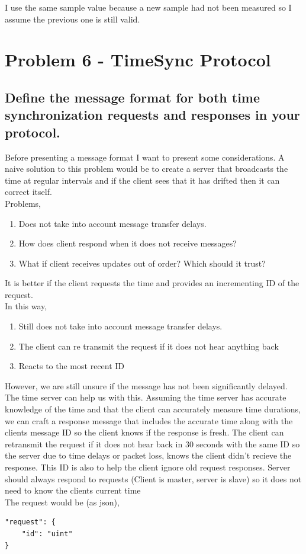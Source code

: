 \documentclass{article}
\begin{document}
	I use the same sample value because a new sample had not been measured so I assume the previous one is still valid.

\section{Problem 6 - TimeSync Protocol}

\subsection{Define the message format for both time synchronization requests and responses
in your protocol.}
		Before presenting a message format I want to present some considerations. A naive solution to this problem would be to create a 
		server that broadcasts the time at regular intervals and if the client sees that it has drifted then it can correct itself. \\

		Problems,
		\begin{enumerate}
			\item Does not take into account message transfer delays.
			\item How does client respond when it does not receive messages?
			\item What if client receives updates out of order? Which should it trust?
		\end{enumerate}

		It is better if the client requests the time and provides an incrementing ID of the request.\\
		In this way,
		\begin{enumerate}
			\item Still does not take into account message transfer delays.
			\item The client can re transmit the request if it does not hear anything back
			\item Reacts to the most recent ID
		\end{enumerate}

		However, we are still unsure if the message has not been significantly delayed. The time server can help us with this.
		Assuming the time server has accurate knowledge of the time and that the client can accurately measure time durations, we can craft a response message that includes the accurate time along with the clients message ID so
		the client knows if the response is fresh. The client can retransmit the request if it does not hear back in 30 seconds with the same ID so the server due to time delays or packet loss,
		knows the client didn't recieve the response. This ID is also to help the client ignore old request responses. Server should always respond to requests (Client is master, server is slave) so it does not need to 
		know the clients current time\\
		The request would be (as json),
		\begin{verbatim}
"request": {
	"id": "uint"
}
		\end{verbatim}
\end{document}
